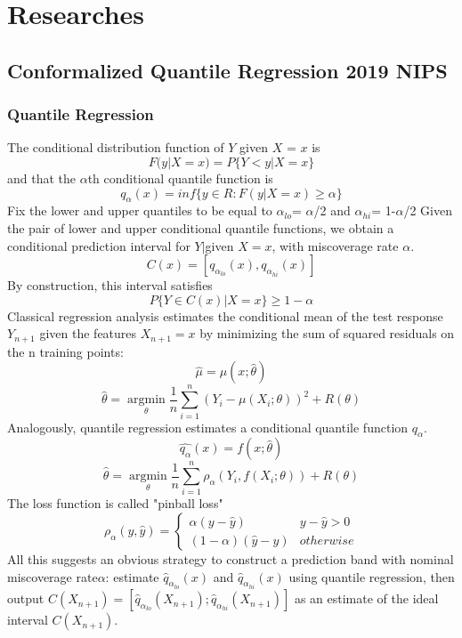 \documentclass{article}
\begin{document}
\section{Researches}
\subsection{Conformalized Quantile Regression 2019 NIPS}
\subsubsection{Quantile Regression}
The conditional distribution function of $Y$ given $X$ = $x$ is
\[F(y|X=x)=P\{Y<y|X=x\}\]
and that the $\alpha$th conditional quantile function is
\[q_\alpha(x)=inf\{y\in R:F(y|X=x)\ge\alpha\}\]
Fix the lower and upper quantiles to be equal to $\alpha_{lo}$= $\alpha$/2 and $\alpha_{hi}$= 1-$\alpha$/2
Given the pair of lower and upper conditional quantile functions, we obtain a conditional prediction interval for $Y|$given $X=x$, with miscoverage rate $\alpha$.
\[C(x)=[q_{\alpha_{lo}}(x),q_{\alpha_{hi}}(x)]\]
By construction, this interval satisfies
\[P\{Y\in C(x)|X=x\}\ge 1-\alpha\]
Classical regression analysis estimates the conditional mean of the test response $Y_{n+1}$ given the features $X_{n+1}=x$ by minimizing the sum of squared residuals on the n training points:
\[\hat{\mu}=\mu(x;\hat{\theta})\]
\[\hat{\theta}=\operatorname*{argmin}_\theta \frac{1}{n}\sum_{i=1}^{n}(Y_i-\mu(X_i;\theta))^2+R(\theta)\]
Analogously, quantile regression estimates a conditional quantile function $q_\alpha$.
\[\hat{q_\alpha}(x)=f(x;\hat{\theta})\]
\[\hat{\theta}=\operatorname*{argmin}_\theta \frac{1}{n}\sum_{i=1}^{n}\rho_{\alpha}(Y_i,f(X_i;\theta))+R(\theta)\]
The loss function is called "pinball loss"
\[\rho_\alpha(y,\hat{y})=
\begin{cases}
\alpha(y-\hat{y}) & y-\hat{y}>0\\
(1-\alpha)(\hat{y}-y) & otherwise
\end{cases}
\]
All this suggests an obvious strategy to construct a prediction band with nominal miscoverage rate$\alpha$: estimate $\hat{q}_{\alpha_{lo}}(x)$ and $\hat{q}_{\alpha_{hi}} (x)$ using quantile regression, then output $C(X_{n+1})=[\hat{q}_{\alpha_{lo}} (X_{n+1}); \hat{q}_{\alpha_{hi}} 
(X_{n+1})]$ as an estimate of the ideal interval $C(X_{n+1})$.
\end{document}
